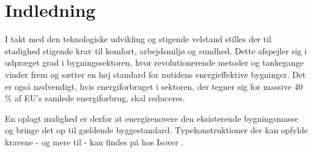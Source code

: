 \chapter{Indledning}

I takt med den teknologiske udvikling og stigende velstand stilles der til stadighed stigende krav til komfort, arbejdsmiljø og sundhed. Dette afspejler sig i udpræget grad i bygningssektoren, hvor revolutionerende metoder og tankegange vinder frem og sætter en høj standard for nutidens energieffektive bygninger. Det er også nødvendigt, hvis energiforbruget i sektoren, der tegner sig for massive 40 \% af EU's samlede energiforbrug, skal reduceres. 

En oplagt mulighed er derfor at energirenovere den eksisterende bygningsmasse og bringe det op til gældende byggestandard. Typekonstruktioner der kan opfylde kravene - og mere til - kan findes på hos Isover \citep{isover}. 